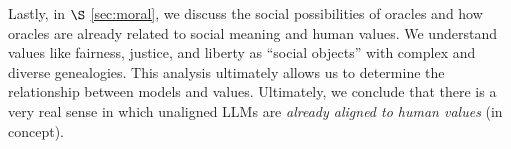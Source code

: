 Lastly, in $\S$ \ref{sec:moral}, we discuss the social possibilities of oracles and how oracles are already related to social meaning and human values. 
We understand values like fairness, justice, and liberty as ``social objects'' with complex and diverse genealogies. 
This analysis ultimately allows us to determine the relationship between models and values. Ultimately, we conclude that there is a very real sense in which unaligned LLMs are \textit{already aligned to human values} (in concept).
